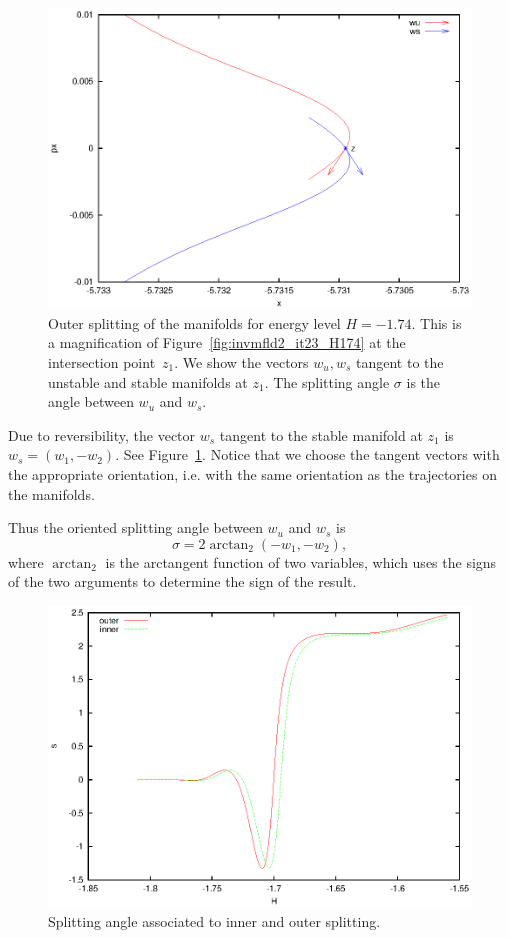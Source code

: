 \begin{figure}
\includegraphics{figs/splitangle}
\caption{Outer splitting of the manifolds for energy level $H=-1.74$. 
This is a magnification of Figure~\ref{fig:invmfld2_it23_H174} at the
intersection point~$z_1$. 
We show the vectors $w_u, w_s$ tangent to the unstable and stable
manifolds at $z_1$. 
The splitting angle $\sigma$ is the angle between $w_u$ and $w_s$.}
\label{fig:splitangle}
\end{figure}

Due to reversibility, the vector $w_s$ tangent to the stable manifold
at $z_1$
is $w_s=(w_1,-w_2)$. See Figure~\ref{fig:splitangle}. Notice that we
choose the tangent vectors with the appropriate orientation, i.e. with
the same orientation as the trajectories on the manifolds. 

Thus the oriented splitting angle between $w_u$ and $w_s$ is 
\[ \sigma= 2\arctan_2(-w_1,-w_2), \]
where $\arctan_2$ is the arctangent function of two variables, which
uses the signs of the two arguments to determine the sign of the
result.

\begin{figure}
\includegraphics{figs/splittings}
\caption{Splitting angle associated to inner and outer splitting.}
\label{fig:splittings}
\end{figure}

